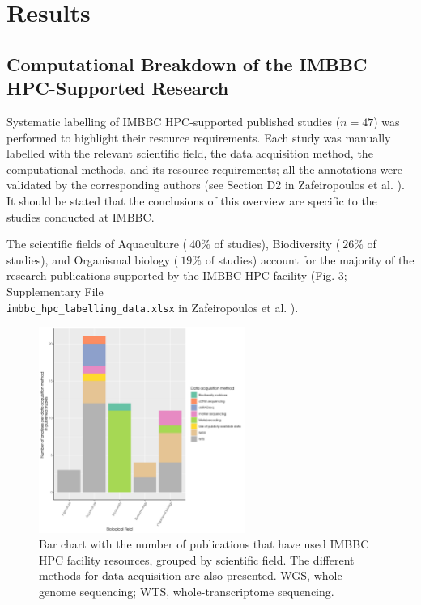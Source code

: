    \section{Results}

   \subsection{Computational Breakdown of the IMBBC HPC-Supported Research}

   Systematic labelling of IMBBC HPC-supported published studies ($n = 47$) was performed to highlight their resource requirements. 
   Each study was manually labelled with the relevant scientific field, the data acquisition method, the computational methods, and its resource requirements; 
   all the annotations were validated by the corresponding authors (see Section D2 in Zafeiropoulos et al. \citep{haris_zafeiropoulos_2021_4665308}). 
   It should be stated that the conclusions of this overview are specific to the studies conducted at IMBBC.

   The scientific fields of Aquaculture ($~40\%$ of studies), Biodiversity ($~26\%$ of studies), and Organismal biology ($~19\%$ of studies) account for the majority of the research publications supported by the IMBBC HPC facility (Fig. 3; Supplementary File \\
   \texttt{imbbc\_hpc\_labelling\_data.xlsx} in Zafeiropoulos et al. \citep{haris_zafeiropoulos_2021_4665308}).
   

   \begin{figure}
      \centering
      \label{fig:studies}
      \includegraphics[width=0.6\textwidth]{figures/number_of_studies_biological_field_data_acquisition_method_plot.png}
      \caption[IMBBC HPC supported published studies grouped by scientific field]{
         Bar chart with the number of publications that have used IMBBC HPC facility resources, grouped by scientific field. The different methods for data acquisition are also presented. WGS, whole-genome sequencing; WTS, whole-transcriptome sequencing.
      }

   \end{figure}


